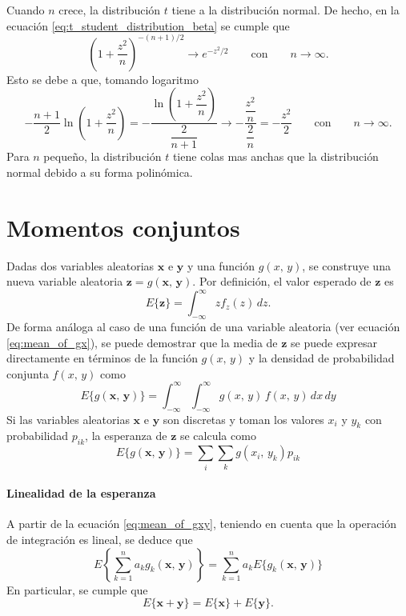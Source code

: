 \documentclass[a4paper]{report}
\newcommand{\x}{\mathbf{x}}
\newcommand{\y}{\mathbf{y}}
\newcommand{\z}{\mathbf{z}}
\begin{document}
Cuando \(n\) crece, la distribución \(t\) tiene a la distribución normal. De hecho, en la ecuación \ref{eq:t_student_distribution_beta} se cumple que 
\[
 \left(1+\frac{z^2}{n}\right)^{-(n+1)/2}\to e^{-z^2/2}\qquad\textrm{con}\qquad n\to\infty.
\]
Esto se debe a que, tomando logaritmo
\[
 -\frac{n+1}{2}\ln\left(1+\frac{z^2}{n}\right)=-\dfrac{\ln\left(1+\dfrac{z^2}{n}\right)}{\dfrac{2}{n+1}}\to-\dfrac{\dfrac{z^2}{n}}{\dfrac{2}{n}}=-\frac{z^2}{2}
 \qquad\textrm{con}\qquad n\to\infty.
\]
Para \(n\) pequeño, la distribución \(t\) tiene colas mas anchas que la distribución normal debido a su forma polinómica.


\section{Momentos conjuntos}

Dadas dos variables aleatorias \(\x\) e \(\y\) y una función \(g(x,\,y)\), se construye una nueva variable aleatoria \(\z=g(\x,\,\y)\). Por definición, el valor esperado de \(\z\) es
\[
 E\{\z\}=\int_{-\infty}^{\infty}zf_z(z)\,dz.
\]
De forma análoga al caso de una función de una variable aleatoria (ver ecuación \ref{eq:mean_of_gx}), se puede demostrar que la media de \(\z\) se puede expresar directamente en términos de la función \(g(x,\,y)\) y la densidad de probabilidad conjunta \(f(x,\,y)\) como
\begin{equation}\label{eq:mean_of_gxy}
 E\{g(\x,\,\y)\}=\int_{-\infty}^{\infty}\int_{-\infty}^{\infty}g(x,\,y)\,f(x,\,y)\,dx\,dy
\end{equation}
Si las variables aleatorias \(\x\) e \(\y\) son discretas y toman los valores \(x_i\) y \(y_k\) con probabilidad \(p_{ik}\), la esperanza de \(\z\) se calcula como
\[
 E\{g(\x,\,\y)\}=\sum_{i}\sum_{k}g(x_i,\,y_k)p_{ik}
\]

\paragraph{Linealidad de la esperanza}

A partir de la ecuación \ref{eq:mean_of_gxy}, teniendo en cuenta que la operación de integración es lineal, se deduce que
\begin{equation}\label{eq:mean_linearity}
 E\left\{\sum_{k=1}^{n}a_kg_k(\x,\,\y)\right\}=\sum_{k=1}^{n}a_kE\{g_k(\x,\,\y)\}
\end{equation}
En particular, se cumple que
\[
 E\{\x+\y\}=E\{\x\}+E\{\y\}.
\]
\end{document}
